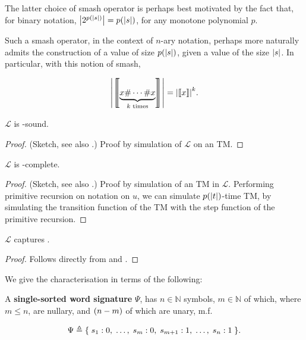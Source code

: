The latter choice of smash operator is perhaps best motivated by the fact that,
for binary notation, ${\mathopen{}\left|{2^{p{\mathopen{}\left({{\mathopen{}\left|{s}\right|\mathclose{}}}\right)\mathclose{}}}}\right|\mathclose{}} = p{\mathopen{}\left({{\mathopen{}\left|{s}\right|\mathclose{}}}\right)\mathclose{}}$, for any
monotone polynomial $p$.

Such a smash operator, in the context of $n$-ary notation,  perhaps more
naturally admits the construction of a value of size $p{\mathopen{}\left({{\mathopen{}\left|{s}\right|\mathclose{}}}\right)\mathclose{}}$, given a
value of the size ${\mathopen{}\left|{s}\right|\mathclose{}}$. In particular, with this notion of smash,

$${\mathopen{}\left|{{\mathopen{}\left\llbracket{\underbrace{x \ensuremath{\mathtt{\#}}{} \cdots \ensuremath{\mathtt{\#}}{} x}_{\text{$k$ times}}}\right\rrbracket\mathclose{}}}\right|\mathclose{}} =
{\mathopen{}\left|{{\mathopen{}\left\llbracket{x}\right\rrbracket\mathclose{}}}\right|\mathclose{}}^k.$$

\begin{lemma} \label{lem:l-fptime-sound} $\mathcal{L}$ is \FPTIME{}-sound.
\end{lemma}

\begin{proof} (Sketch, see also \cite{rose-1984, tourlakis-1984, clote-1999}.)
Proof by simulation of $\mathcal{L}$ on an \FPTIME{} TM.   \end{proof}

\begin{lemma} \label{lem:l-fptime-complete} $\mathcal{L}$ is
\FPTIME{}-complete. \end{lemma}

\begin{proof} (Sketch, see also \cite{rose-1984}.) Proof by simulation of an
\FPTIME{} TM in $\mathcal{L}$. Performing primitive recursion on notation on
$u$, we can simulate $p{\mathopen{}\left({{\mathopen{}\left|{t}\right|\mathclose{}}}\right)\mathclose{}}$-time TM, by simulating the transition
function of the TM with the step function of the primitive recursion.
 \end{proof}

\begin{theorem} \label{thm:l-captures-fptime} $\mathcal{L}$ captures \FPTIME{}.
\end{theorem}

\begin{proof} Follows directly from  and
. \end{proof}

We give the characterisation in terms of the following:

\begin{definition} A \textbf{single-sorted word signature} $\Psi$,
has $n \in \mathbb{N}$ symbols, $m \in \mathbb{N}$ of which, where $m \leq n$,
are nullary, and ${\mathopen{}\left({n-m}\right)\mathclose{}}$ of which are unary, m.f.

$$\Psi \triangleq \mathopen{}\left\{\mathrel{}{s_1 : 0, \; \ldots, \; s_m : 0, \; s_{m+1} : 1, \;
\ldots, \; s_n : 1}\mathrel{}\right\}\mathclose{}.$$

\end{definition}

